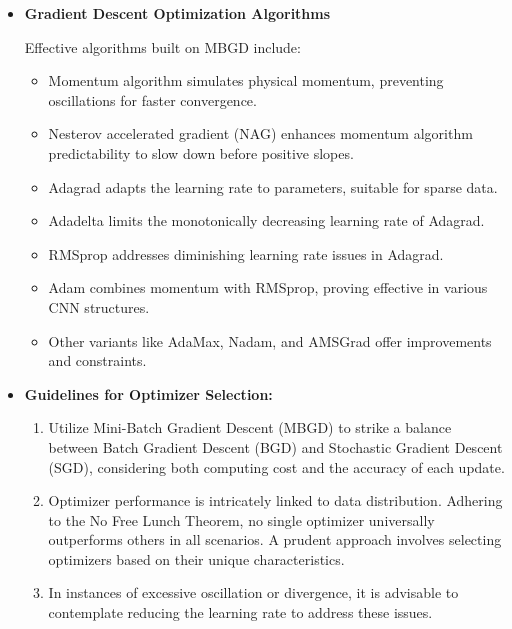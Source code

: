 	\begin{itemize}
		\item \textbf{Gradient Descent Optimization Algorithms}
		
		Effective algorithms built on MBGD include:
		
		\begin{itemize}
			\item Momentum algorithm simulates physical momentum, preventing oscillations for faster convergence.
			\item Nesterov accelerated gradient (NAG) enhances momentum algorithm predictability to slow down before positive slopes.
			\item Adagrad adapts the learning rate to parameters, suitable for sparse data.
			\item Adadelta limits the monotonically decreasing learning rate of Adagrad.
			\item RMSprop addresses diminishing learning rate issues in Adagrad.
			\item Adam combines momentum with RMSprop, proving effective in various CNN structures.
			\item Other variants like AdaMax, Nadam, and AMSGrad offer improvements and constraints.
		\end{itemize}
		
	\item \textbf{Guidelines for Optimizer Selection:}
		
		\begin{enumerate}
			\item Utilize Mini-Batch Gradient Descent (MBGD) to strike a balance between Batch Gradient Descent (BGD) and Stochastic Gradient Descent (SGD), considering both computing cost and the accuracy of each update.
			
			\item Optimizer performance is intricately linked to data distribution. Adhering to the No Free Lunch Theorem, no single optimizer universally outperforms others in all scenarios. A prudent approach involves selecting optimizers based on their unique characteristics.
			
			\item In instances of excessive oscillation or divergence, it is advisable to contemplate reducing the learning rate to address these issues.
		\end{enumerate}
		
	\end{itemize}


